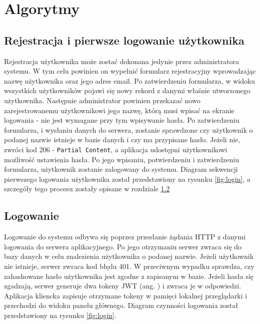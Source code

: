 \section{Algorytmy}

\subsection{Rejestracja i pierwsze logowanie użytkownika}

Rejestracja użytkownika może zostać dokonana jedynie przez administratora systemu. W tym celu powinien on wypełnić formularz rejestracyjny wprowadzając nazwę użytkownika oraz jego adres email. Po zatwierdzeniu formularza, w widoku wszystkich użytkowników pojawi się nowy rekord z danymi właśnie utworzonego użytkownika. Następnie administrator powinien przekazać nowo zarejestrowanemu użytkownikowi jego nazwę, którą musi wpisać na ekranie logowania - nie jest wymagane przy tym wpisywanie hasła. Po zatwierdzeniu formularza, i wysłaniu danych do serwera, zostanie sprawdzone czy użytkownik o podanej nazwie istnieje w bazie danych i czy ma przypisane hasło. Jeżeli nie, zwróci kod 206 - \texttt{Partial Content}, a aplikacja udostępni użytkownikowi możliwość ustawienia hasła. Po jego wpisaniu, potwierdzeniu i zatwierdzeniu formularza, użytkownik zostanie zalogowany do systemu. Diagram sekwencji pierwszego logowania użytkownika został przedstawiony na rysunku \ref{fig:login}, a szczegóły tego procesu zostały opisane w rozdziale \ref{ss:logowanie}

\subsection{Logowanie}
\label{ss:logowanie}

Logowanie do systemu odbywa się poprzez przesłanie żądania HTTP z danymi logowania do serwera aplikacyjnego. Po jego otrzymaniu serwer zwraca się do bazy danych w celu znalezienia użytkownika o podanej nazwie. Jeżeli użytkownik nie istnieje, serwer zwraca kod błędu 401. W przeciwnym wypadku sprawdza, czy zahashowane hasło użytkownika jest zgodne z zapisanym w bazie. Jeżeli hasła się zgadzają, serwer generuje dwa tokeny JWT (ang. ) i zwraca je w odpowiedzi. Aplikacja kliencka zapisuje otrzymane tokeny w pamięci lokalnej przeglądarki i przechodzi do widoku panelu głównego. Diagram czynności logowania został przedstawiony na rysunku \ref{fig:login}.

